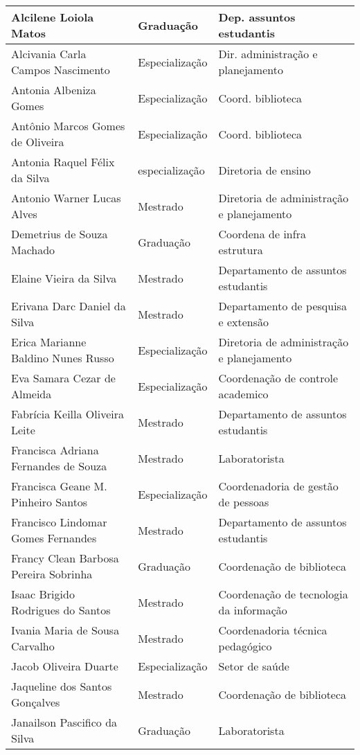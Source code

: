 \begin{longtable}{|p{6cm}|p{3cm}|p{4cm}|}
Alcilene Loiola Matos & Graduação & Dep. assuntos estudantis\\
\hline
Alcivania Carla Campos Nascimento & Especialização & Dir. administração e planejamento \\
\hline
Antonia Albeniza Gomes & Especialização & Coord. biblioteca\\
\hline
Antônio Marcos Gomes de Oliveira & Especialização & Coord. biblioteca\\
\hline
Antonia Raquel Félix da Silva & especialização & Diretoria de ensino\\
\hline
Antonio Warner Lucas Alves & Mestrado & Diretoria de administração e planejamento\\
\hline
Demetrius de Souza Machado & Graduação & Coordena de infra estrutura\\
\hline
Elaine Vieira da Silva & Mestrado & Departamento de assuntos estudantis \\
\hline
Erivana Darc Daniel da Silva & Mestrado & Departamento de pesquisa e extensão\\
\hline
Erica Marianne Baldino Nunes Russo & Especialização & Diretoria de administração e planejamento\\
\hline
Eva Samara Cezar de Almeida & Especialização & Coordenação de controle academico \\
\hline
Fabrícia Keilla Oliveira Leite & Mestrado & Departamento de assuntos estudantis\\
\hline
Francisca Adriana Fernandes de Souza & Mestrado & Laboratorista \\
\hline
Francisca Geane M. Pinheiro Santos & Especialização & Coordenadoria de gestão de pessoas\\
\hline
Francisco Lindomar Gomes Fernandes & Mestrado & Departamento de assuntos estudantis\\
\hline
Francy Clean Barbosa Pereira Sobrinha & Graduação & Coordenação de biblioteca\\
\hline
Isaac Brigido Rodrigues do Santos & Mestrado & Coordenação de tecnologia da informação\\
\hline
Ivania Maria de Sousa Carvalho & Mestrado & Coordenadoria técnica pedagógico\\
\hline
Jacob Oliveira Duarte & Especialização & Setor de saúde\\
\hline
Jaqueline dos Santos Gonçalves & Mestrado & Coordenação de biblioteca\\
\hline
Janailson Pascifico da Silva & Graduação & Laboratorista\\
\hline

\end{longtable}
